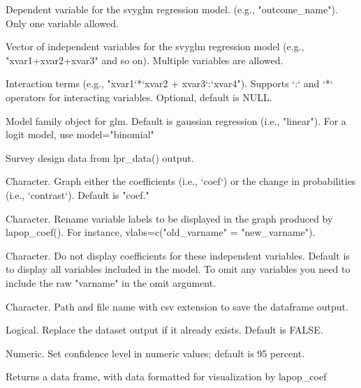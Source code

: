 \documentclass[a4paper]{book}
\begin{document}
%
\begin{Arguments}
\begin{ldescription}
\item[\code{outcome}] Dependent variable for the svyglm regression model. (e.g., "outcome\_name"). Only one variable allowed.

\item[\code{xvar}] Vector of independent variables for the svyglm regression model (e.g., "xvar1+xvar2+xvar3" and so on). Multiple variables are allowed.

\item[\code{interact}] Interaction terms (e.g., "xvar1`*`xvar2 + xvar3`:`xvar4"). Supports `:` and `*` operators for interacting variables. Optional, default is NULL.

\item[\code{model}] Model family object for glm. Default is gaussian regression (i.e., "linear"). For a logit model, use model="binomial"

\item[\code{data}] Survey design data from lpr\_data() output.

\item[\code{estimate}] Character. Graph either the coefficients (i.e., `coef`) or the change in probabilities (i.e., `contrast`). Default is "coef."

\item[\code{vlabs}] Character. Rename variable labels to be displayed in the graph produced by lapop\_coef(). For instance, vlabs=c("old\_varname" = "new\_varname").

\item[\code{omit}] Character. Do not display coefficients for these independent variables. Default is to display all variables included in the model. To omit any variables you need to include the raw "varname" in the omit argument.

\item[\code{filesave}] Character. Path and file name with csv extension to save the dataframe output.

\item[\code{replace}] Logical. Replace the dataset output if it already exists. Default is FALSE.

\item[\code{level}] Numeric. Set confidence level in numeric values; default is 95 percent.
\end{ldescription}
\end{Arguments}
%
\begin{Value}
Returns a data frame, with data formatted for visualization by lapop\_coef
\end{Value}
\end{document}
